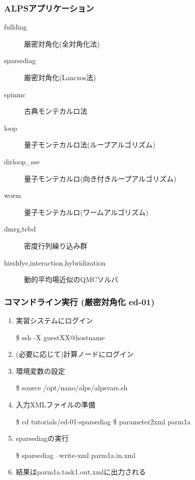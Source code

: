\begin{frame}
  \frametitle{ALPSアプリケーション}
  \begin{description}
  \item[fulldiag] {\color{red} 厳密対角化(全対角化法)}
  \item[sparsediag] {\color{red} 厳密対角化(Lanczos法)}
  \item[spinmc] {\color{red} 古典モンテカルロ法}
  \item[loop] {\color{red} 量子モンテカルロ法(ループアルゴリズム)}
  \item[dirloop\_sse] {\color{red} 量子モンテカルロ(向き付きループアルゴリズム)}
  \item[worm] 量子モンテカルロ(ワームアルゴリズム)
  \item[dmrg,tebd] 密度行列繰り込み群
  \item[hirshfye,interaction,hybridization] 動的平均場近似のQMCソルバ
  \end{description}
\end{frame}

\begin{frame}[fragile]
  \frametitle{コマンドライン実行 (厳密対角化 ed-01)}
  \begin{enumerate}
  \item 実習システムにログイン
\begin{semiverbatim}
\$ ssh -X guest{\color{red}XX}@{\color{red}hostname}
\end{semiverbatim}
  \item (必要に応じて)計算ノードにログイン
  \item 環境変数の設定
\begin{semiverbatim}
\$ source /opt/nano/alps/alpsvars.sh
\end{semiverbatim}
  \item 入力XMLファイルの準備
\begin{semiverbatim}
\$ cd tutorials/ed-01-sparsediag
\$ parameter2xml parm1a
\end{semiverbatim}
  \item sparsediagの実行
\begin{semiverbatim}
\$ sparsediag --write-xml parm1a.in.xml
\end{semiverbatim}
  \item 結果はparm1a.task1.out.xmlに出力される
  \end{enumerate}
\end{frame}

